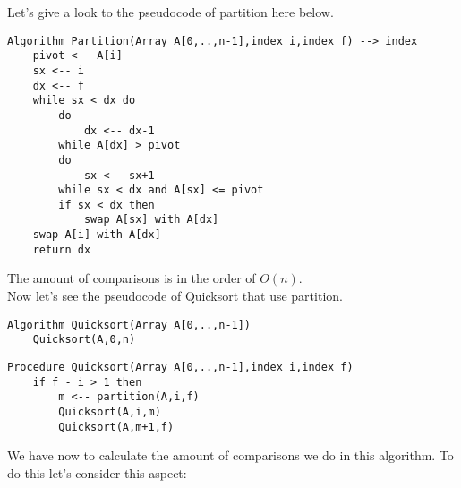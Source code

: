 \documentclass{article}
\begin{document}
Let's give a look to the pseudocode of partition here below.\\

\begin{lstlisting}[caption={\\\textit{Partition algorithm.}}]
Algorithm Partition(Array A[0,..,n-1],index i,index f) --> index
	pivot <-- A[i]
	sx <-- i
	dx <-- f
	while sx < dx do
		do
			dx <-- dx-1
		while A[dx] > pivot
		do
			sx <-- sx+1
		while sx < dx and A[sx] <= pivot
		if sx < dx then
			swap A[sx] with A[dx]
	swap A[i] with A[dx]
	return dx
\end{lstlisting}

The amount of comparisons is in the order of $O(n)$.\\
Now let's see the pseudocode of Quicksort that use partition.\\

\begin{lstlisting}[caption={\\\textit{Quicksort algorithm.}}]
Algorithm Quicksort(Array A[0,..,n-1])
	Quicksort(A,0,n)
\end{lstlisting}

\begin{lstlisting}[caption={\\\textit{Quicksort procedure.}}]
Procedure Quicksort(Array A[0,..,n-1],index i,index f)
	if f - i > 1 then
		m <-- partition(A,i,f)
		Quicksort(A,i,m)
		Quicksort(A,m+1,f)
\end{lstlisting}

We have now to calculate the amount of comparisons we do in this algorithm. To do this let's consider this aspect:\\

\end{document}
